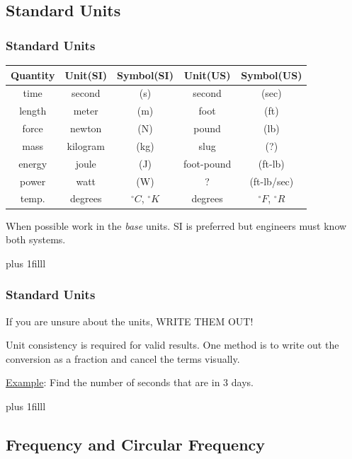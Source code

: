 \documentclass[fleqn]{beamer} %
\newcommand{\sectionIIsubsectionItitle}{Standard Units}
\newcommand{\sectionIIsubsectionIIItitle}{Frequency and Circular Frequency}
\newcommand{\btVFill}{\vskip0pt plus 1filll}
\begin{document}
		\subsection{\sectionIIsubsectionItitle}\label{sectionIIsubsectionI}

			\begin{frame}[label=sectionIIsubsectionI]
				\frametitle{\sectionIIsubsectionItitle}
				\bigskip
				
				\renewcommand{\arraystretch}{1.2}
				\begin{tabular}{|c|c|c|c|c|} \hline
				\textbf{Quantity}&\textbf{Unit(SI)} &\textbf{ Symbol(SI)}&\textbf{Unit(US)}&\textbf{Symbol(US)}\\ \hline
				time&second&(s)&second&(sec)\\ \hline
				length&meter&(m)&foot&(ft)\\ \hline
				force&newton&(N)&pound&(lb)\\ \hline
				mass&kilogram&(kg)&slug&(?) \\\hline
				energy&joule&(J)&foot-pound&(ft-lb)\\ \hline
				power&watt&(W)&?&(ft-lb/sec)\\ \hline
				temp.&degrees&$^\circ C$, $^\circ K$&degrees&$^\circ F$, $^\circ R$ \\ \hline
				\end{tabular}

				\vspace{3mm}When possible work in the {\it base} units. SI is preferred but engineers must know both systems.

				\btVFill
			\end{frame}

		    \begin{frame}[label=sectionIIsubsectionI]
				\frametitle{\sectionIIsubsectionItitle}
				\bigskip
				
				If you are unsure about the units, WRITE THEM OUT!

				Unit consistency is required for valid results. One method is to write out the conversion as a fraction and cancel the terms visually.\vspc

				\underline{Example}: Find the number of seconds that are in 3 days. \vspcc


				\btVFill
			\end{frame}	

		\subsection{\sectionIIsubsectionIIItitle}\label{sectionIIsubsectionIII}
\end{document}
